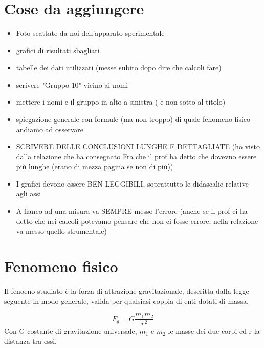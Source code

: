 \documentclass[12pt, a4paper]{article}
\title{\textbf{\scalebox{1.3}{\text{Caduta libera}}}}
\date{}
\begin{document}
\maketitle
{}%


\section{Cose da aggiungere}
\begin{itemize}
    \item Foto scattate da noi dell'apparato sperimentale
    \item grafici di risultati sbagliati
    \item tabelle dei dati utilizzati (messe subito dopo dire che calcoli fare)
    \item scrivere "Gruppo $10$" vicino ai nomi
    \item mettere i nomi e il gruppo in alto a sinistra ( e non sotto al titolo)
    \item spiegazione generale con formule (ma non troppo) di quale fenomeno fisico andiamo ad osservare
    \item SCRIVERE DELLE CONCLUSIONI LUNGHE E DETTAGLIATE (ho visto dalla relazione che ha consegnato Fra che il prof ha detto che dovevno essere più lunghe (erano di mezza pagina se non di più))
    \item I grafici devono essere BEN LEGGIBILI, soprattutto le didascalie relative agli assi
    \item A fianco ad una misura va SEMPRE messo l'errore (anche se il prof ci ha detto che nei calcoli potevamo pensare che non ci fosse errore, nella relazione va messo quello strumentale)
\end{itemize}


\section{Fenomeno fisico}
Il fenoeno studiato è la forza di attrazione gravitazionale, descritta dalla legge seguente in modo generale, valida per qualsiasi coppia di enti dotati di massa. 

\begin{equation}
    F_g = G\frac{m_1 m_2}{r^2}
\end{equation}
Con G costante di gravitazione universale, $m_1$ e $m_2$ le masse dei due corpi ed r la distanza tra essi.
\end{document}
